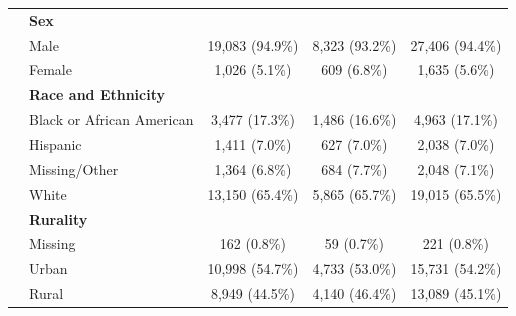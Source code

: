 \documentclass[useAMS,referee, usegraphicx]{biom}
\begin{document}
\begin{table}[H]
\begin{tabular}{clccc}
                                                    & { \textbf{Sex}}                            &                                                      &                                                     &                                                       \\
                                                    & { Male}                                    & { 19,083 (94.9\%)} & { 8,323 (93.2\%)} & { 27,406 (94.4\%)}  \\
                                                    & { Female}                                  & { 1,026 (5.1\%)}   & { 609 (6.8\%)}    & { 1,635 (5.6\%)}    \\
                                                    & { \textbf{Race and Ethnicity}}             &                                                      &                                                     &                                                       \\
                                                    & { Black or African American}               & { 3,477 (17.3\%)}  & { 1,486 (16.6\%)} & { 4,963 (17.1\%)}   \\
                                                    & { Hispanic}                                & { 1,411 (7.0\%)}   & { 627 (7.0\%)}    & { 2,038 (7.0\%)}    \\
                                                    & { Missing/Other}                           & { 1,364 (6.8\%)}   & { 684 (7.7\%)}    & { 2,048 (7.1\%)}    \\
                                                    & { White}                                   & { 13,150 (65.4\%)} & { 5,865 (65.7\%)} & { 19,015 (65.5\%)}  \\
                                                    & { \textbf{Rurality}}                       &                                                      &                                                     &                                                       \\
                                                    & { Missing}                                 & { 162 (0.8\%)}     & { 59 (0.7\%)}     & { 221 (0.8\%)}      \\
                                                    & { Urban}                                   & { 10,998 (54.7\%)} & { 4,733 (53.0\%)} & { 15,731 (54.2\%)}  \\
                                                    & { Rural}                                   & { 8,949 (44.5\%)}  & { 4,140 (46.4\%)} & { 13,089 (45.1\%)}  \\

\end{tabular}
\end{table}
\end{document}
